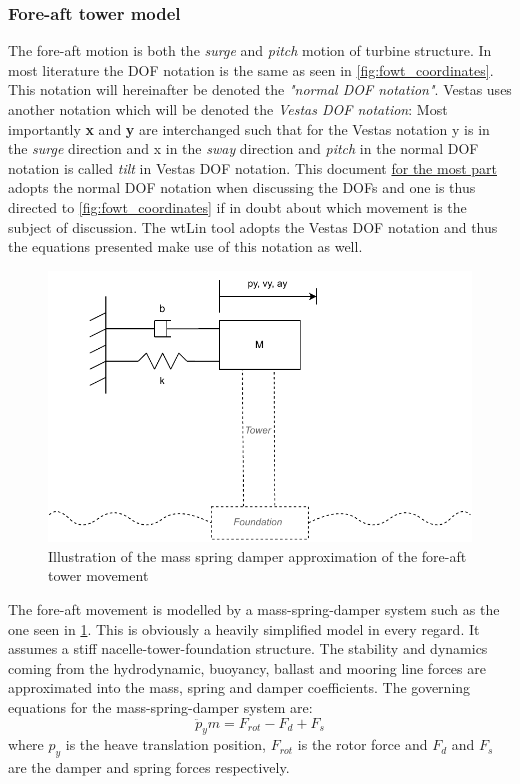 \subsubsection{Fore-aft tower model} \label{sec:mod_wtLin_foreaft_mod}
The fore-aft motion is both the \textit{surge} and \textit{pitch} motion of turbine structure. In most literature the DOF notation is the same as seen in \cref{fig:fowt_coordinates}. This notation will hereinafter be denoted the \textit{"normal DOF notation"}. Vestas uses another notation which will be denoted the \textit{Vestas DOF notation}: Most importantly \textbf{x} and \textbf{y} are interchanged such that for the Vestas notation y is in the \textit{surge} direction and x in the \textit{sway} direction and \textit{pitch} in the normal DOF notation is called \textit{tilt} in Vestas DOF notation. This document \underline{for the most part} adopts the normal DOF notation when discussing the DOFs and one is thus directed to \cref{fig:fowt_coordinates} if in doubt about which movement is the subject of discussion. The wtLin tool adopts the Vestas DOF notation and thus the equations presented make use of this notation as well.
\begin{figure}[ht]
	\centering
	\includegraphics[width=0.7\linewidth]{Graphics/wtLinForeAftMotionModel.pdf}
	\caption{Illustration of the mass spring damper approximation of the fore-aft tower movement}
	\label{fig:wtLin_fore-aft_diagram}
\end{figure}
The fore-aft movement is modelled by a mass-spring-damper system such as the one seen in \cref{fig:wtLin_fore-aft_diagram}. This is obviously a heavily simplified model in every regard. It assumes a stiff nacelle-tower-foundation structure. The stability and dynamics coming from the hydrodynamic, buoyancy, ballast and mooring line forces are approximated into the mass, spring and damper coefficients. The governing equations for the mass-spring-damper system are:
\begin{equation}\label{eq:wtlin_comp_fore-aft_ay1}
	\ddot{p}_y m = F_{rot} - F_d + F_s
\end{equation}
where $ p_y $ is the heave translation position, $ F_{rot} $ is the rotor force and $ F_d $ and $ F_s $ are the damper and spring forces respectively.

